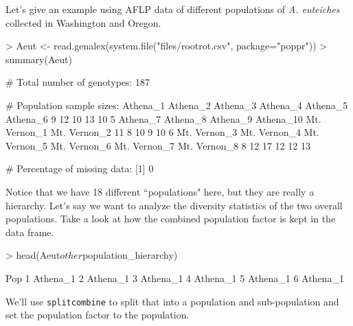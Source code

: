 \documentclass[letterpaper]{article}
\begin{document}
Let's give an example using AFLP data of different populations of \textit{A. euteiches} collected in Washington and Oregon. \cite{Grunwald:2006}
\begin{Schunk}
\begin{Sinput}
> Aeut <- read.genalex(system.file("files/rootrot.csv", package="poppr"))
> summary(Aeut)
\end{Sinput}
\begin{Soutput}
 # Total number of genotypes:  187 

 # Population sample sizes:  
    Athena_1     Athena_2     Athena_3     Athena_4     Athena_5     Athena_6 
           9           12           10           13           10            5 
    Athena_7     Athena_8     Athena_9    Athena_10 Mt. Vernon_1 Mt. Vernon_2 
          11            8           10            9           10            6 
Mt. Vernon_3 Mt. Vernon_4 Mt. Vernon_5 Mt. Vernon_6 Mt. Vernon_7 Mt. Vernon_8 
           8           12           17           12           12           13 

 # Percentage of missing data:  
[1] 0
\end{Soutput}
\end{Schunk}
\begin{center}
\end{center}
Notice that we have 18 different ``populations" here, but they are really a hierarchy. Let's say we want to analyze the diversity statistics of the two overall populations. Take a look at how the combined population factor is kept in the data frame.
\begin{Schunk}
\begin{Sinput}
> head(Aeut$other$population_hierarchy)
\end{Sinput}
\begin{Soutput}
       Pop
1 Athena_1
2 Athena_1
3 Athena_1
4 Athena_1
5 Athena_1
6 Athena_1
\end{Soutput}
\end{Schunk}
We'll use \texttt{splitcombine} to split that into a population and sub-population and set the population factor to the population.
\end{document}
